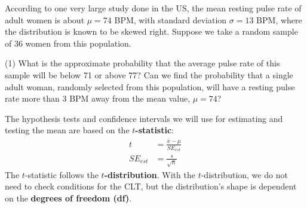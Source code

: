 \documentclass[../mathNotesPreamble]{subfiles}
\begin{document}
  \begin{ex*}
    According to one very large study done in the US, the mean resting pulse rate of adult women is about $\mu=74$ BPM, with standard deviation $\sigma=13$ BPM, where the distribution is known to be skewed right. Suppose we take a random sample of 36 women from this population.
  \end{ex*}
  \begin{extasks}[after-item-skip=\stretch{1}](1)
    \task What is the approximate probability that the average pulse rate of this sample will be below 71 or above 77?
    \task Can we find the probability that a single adult woman, randomly selected from this population, will have a resting pulse rate more than 3 BPM away from the mean value, $\mu=74$?
  \end{extasks}
  \pagebreak

  \begin{defn*}
    The hypothesis tests and confidence intervals we will use for estimating and testing the mean are based on the \textbf{$t$-statistic}:
    \begin{align*}
      t&=\frac{\overline{x}-\mu}{SE_{est}}\\[5pt]
      SE_{est}&=\frac{s}{\sqrt{n}}
    \end{align*}
    The $t$-statistic follows the \textbf{$t$-distribution}. With the $t$-distribution, we do not need to check conditions for the CLT, but the distribution's shape is dependent on the \textbf{degrees of freedom (df)}.
  \end{defn*}
  \vspace*{1\baselineskip}

  \begin{center}
  \end{center}

  \pagebreak
\end{document}
